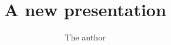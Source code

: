 \documentclass{beamer}
\title{A new presentation}
\author{The author}
\institute{The Institute that pays him}
\begin{document}
\begin{frame}
  \titlepage
\end{frame}
\end{document}
